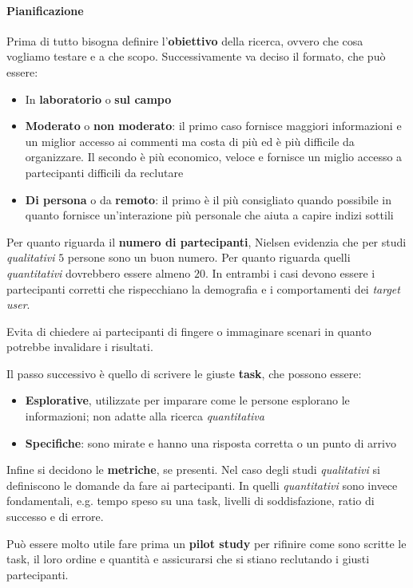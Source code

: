 \newpage
\paragraph{Pianificazione} Prima di tutto bisogna definire l'\textbf{obiettivo} della ricerca, ovvero che cosa vogliamo testare e a che scopo. Successivamente va deciso il formato, che può essere:
\begin{itemize}
	\item In \textbf{laboratorio} o \textbf{sul campo}
	\item \textbf{Moderato} o \textbf{non moderato}: il primo caso fornisce maggiori informazioni e un miglior accesso ai commenti ma costa di più ed è più difficile da organizzare. Il secondo è più economico, veloce e fornisce un miglio accesso a partecipanti difficili da reclutare
	\item \textbf{Di persona} o da \textbf{remoto}: il primo è il più consigliato quando possibile in quanto fornisce un'interazione più personale che aiuta a capire indizi sottili
\end{itemize}
Per quanto riguarda il \textbf{numero di partecipanti}, Nielsen evidenzia che per studi \textit{qualitativi} $5$ persone sono un buon numero. Per quanto riguarda quelli \textit{quantitativi} dovrebbero essere almeno $20$. In entrambi i casi devono essere i partecipanti corretti che rispecchiano la demografia e i comportamenti dei \textit{target user}.
\begin{note}
	Evita di chiedere ai partecipanti di fingere o immaginare scenari in quanto potrebbe invalidare i risultati.
\end{note}
\noindent Il passo successivo è quello di scrivere le giuste \textbf{task}, che possono essere:
\begin{itemize}
	\item \textbf{Esplorative}, utilizzate per imparare come le persone esplorano le informazioni; non adatte alla ricerca \textit{quantitativa}
	\item \textbf{Specifiche}: sono mirate e hanno una risposta corretta o un punto di arrivo
\end{itemize}
Infine si decidono le \textbf{metriche}, se presenti. Nel caso degli studi \textit{qualitativi} si definiscono le domande da fare ai partecipanti. In quelli \textit{quantitativi} sono invece fondamentali, e.g. tempo speso su una task, livelli di soddisfazione, ratio di successo e di errore.

\begin{note}
	Può essere molto utile fare prima un \textbf{pilot study} per rifinire come sono scritte le task, il loro ordine e quantità e assicurarsi che si stiano reclutando i giusti partecipanti.
\end{note}

